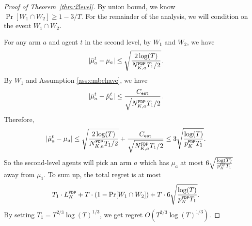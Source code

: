 \begin{proof}[Proof of Theorem~\ref{thm:2level}]
By union bound, we know $\Pr[W_1 \cap W_2] \geq 1 - 3/T$. For the
remainder of the analysis, we will condition on the event
$W_1 \cap W_2$.

For any arm $a$ and agent $t$ in the second level, by $W_1$ and $W_2$, we have
\[
|\bar{\mu}^t_a - \mu_a| \leq \sqrt{\frac{2\log(T)}{N^\mathtt{FDP}_{K,a} T_1 /2}}.
\]
By $W_1$ and Assumption \ref{ass:embehave}, we have
\[
|\bar{\mu}^t_a - \hat{\mu}^t_a| \leq \frac{C_{\mathtt{est}}}{\sqrt{N^\mathtt{FDP}_{K,a} T_1/2}}.
\]
Therefore,
\[
|\hat{\mu}^t_a - \mu_a|\leq \sqrt{\frac{2\log(T)}{N^\mathtt{FDP}_{K,a} T_1 /2}}+\frac{C_{\mathtt{est}}}{\sqrt{N^\mathtt{FDP}_{K,a} T_1/2}} \leq 3 \sqrt{\frac{\log(T)}{p^\mathtt{FDP}_K T_1 }}.
\]
So the second-level agents will pick an arm $a$ which has $\mu_a$ at most $6 \sqrt{\frac{\log(T)}{p^\mathtt{FDP}_K T_1 }}$ away from $\mu_1$. To sum up, the total regret is at most
\[
T_1 \cdot L^\mathtt{FDP}_K + T \cdot (1-\Pr[W_1 \cap W_2]) + T \cdot  6 \sqrt{\frac{\log(T)}{p^\mathtt{FDP}_K T_1 }}.
\]
By setting $T_1 = T^{2/3}\log(T)^{1/3}$, we get regret $O(T^{2/3}\log(T)^{1/3})$.
\end{proof}
